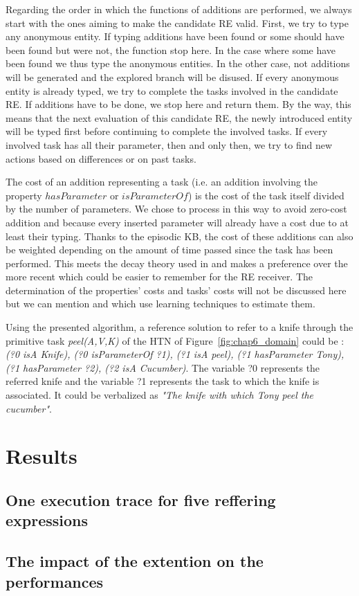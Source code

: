 Regarding the order in which the functions of additions are performed, we always start with the ones aiming to make the candidate RE valid. First, we try to type any anonymous entity. If typing additions have been found or some should have been found but were not, the function stop here. In the case where some have been found we thus type the anonymous entities. In the other case, not additions will be generated and the explored branch will be disused. If every anonymous entity is already typed, we try to complete the tasks involved in the candidate RE. If additions have to be done, we stop here and return them. By the way, this means that the next evaluation of this candidate RE, the newly introduced entity will be typed first before continuing to complete the involved tasks. If every involved task has all their parameter, then and only then, we try to find new actions based on differences or on past tasks.

The cost of an addition representing a task (i.e. an addition involving the property $hasParameter$ or $isParameterOf$) is the cost of the task itself divided by the number of parameters. We chose to process in this way to avoid zero-cost addition and because every inserted parameter will already have a cost due to at least their typing. Thanks to the episodic KB, the cost of these additions can also be weighted depending on the amount of time passed since the task has been performed. This meets the decay theory used in \cite{williams_toward_2020} and makes a preference over the more recent which could be easier to remember for the RE receiver. The determination of the properties' costs and tasks' costs will not be discussed here but we can mention \cite{belke_2002_tracking} and \cite{koolen_2012_learning} which use learning techniques to estimate them.

Using the presented algorithm, a reference solution to refer to a knife through the primitive task \textit{peel(A,V,K)} of the HTN of Figure~\ref{fig:chap6_domain} could be : \textit{(?0 isA Knife), (?0 isParameterOf ?1), (?1 isA peel), (?1 hasParameter Tony), (?1 hasParameter ?2), (?2 isA Cucumber)}. The variable ?0 represents the referred knife and the variable ?1 represents the task to which the knife is associated. It could be verbalized as \textit{"The knife with which Tony peel the cucumber"}.

\section{Results}

\subsection{One execution trace for five reffering expressions}

\subsection{The impact of the extention on the performances}
